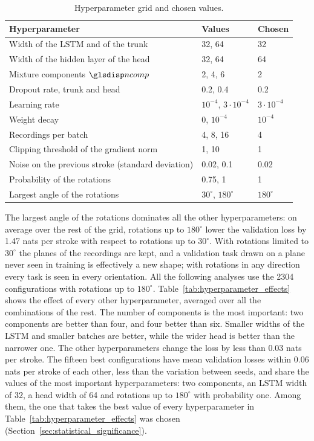 \documentclass[12pt]{report}
\begin{document}
\begin{table}[htbp]
    \centering
    \caption{Hyperparameter grid and chosen values.}
    \label{tab:hyperparameter_grid}
    \begin{tabular}{lll}
        \toprule
        Hyperparameter & Values & Chosen\\
        \midrule
        Width of the LSTM and of the trunk & 32, 64 & 32\\
        Width of the hidden layer of the head & 32, 64 & 64\\
        Mixture components $\sym{ncomp}$ & 2, 4, 6 & 2\\
        Dropout rate, trunk and head & 0.2, 0.4 & 0.2\\
        Learning rate & $10^{-4}$, $3\cdot10^{-4}$ & $3\cdot10^{-4}$\\
        Weight decay & 0, $10^{-4}$ & $10^{-4}$\\
        Recordings per batch & 4, 8, 16 & 4\\
        Clipping threshold of the gradient norm & 1, 10 & 1\\
        Noise on the previous stroke (standard deviation) & 0.02, 0.1 & 0.02\\
        Probability of the rotations & 0.75, 1 & 1\\
        Largest angle of the rotations & $30^\circ$, $180^\circ$ & $180^\circ$\\
        \bottomrule
    \end{tabular}
\end{table}

The largest angle of the rotations dominates all the other hyperparameters: on average over the rest of the grid, rotations up to $180^\circ$ lower the validation loss by 1.47 nats per stroke with respect to rotations up to $30^\circ$. With rotations limited to $30^\circ$ the planes of the recordings are kept, and a validation task drawn on a plane never seen in training is effectively a new shape; with rotations in any direction every task is seen in every orientation. All the following analyses use the 2304 configurations with rotations up to $180^\circ$. Table~\ref{tab:hyperparameter_effects} shows the effect of every other hyperparameter, averaged over all the combinations of the rest. The number of components is the most important: two components are better than four, and four better than six. Smaller widths of the LSTM and smaller batches are better, while the wider head is better than the narrower one. The other hyperparameters change the loss by less than 0.03 nats per stroke. The fifteen best configurations have mean validation losses within 0.06 nats per stroke of each other, less than the variation between seeds, and share the values of the most important hyperparameters: two components, an LSTM width of 32, a head width of 64 and rotations up to $180^\circ$ with probability one. Among them, the one that takes the best value of every hyperparameter in Table~\ref{tab:hyperparameter_effects} was chosen (Section~\ref{sec:statistical_significance}).
\end{document}
